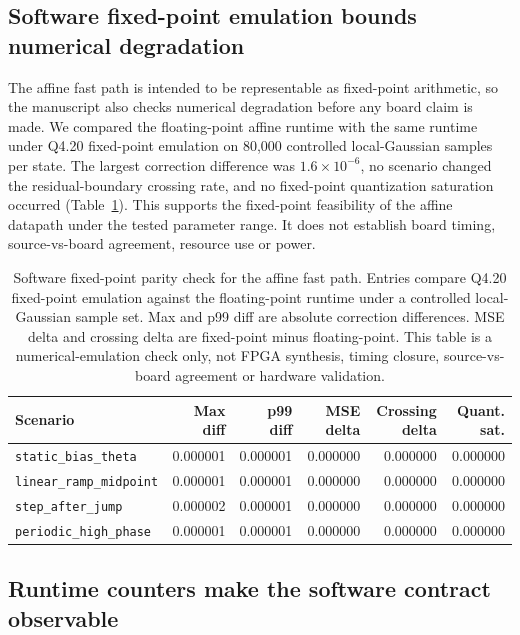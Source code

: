 \documentclass[11pt]{article}
\begin{document}
\subsection{Software fixed-point emulation bounds numerical degradation}

The affine fast path is intended to be representable as fixed-point arithmetic,
so the manuscript also checks numerical degradation before any board claim is
made.  We compared the floating-point affine runtime with the same runtime under
Q4.20 fixed-point emulation on 80,000 controlled local-Gaussian samples per
state.  The largest correction difference was \(1.6\times 10^{-6}\), no
scenario changed the residual-boundary crossing rate, and no fixed-point
quantization saturation occurred (Table~\ref{tab:fixed-point-parity}).  This
supports the fixed-point feasibility of the affine datapath under the tested
parameter range.  It does not establish board timing, source-vs-board agreement,
resource use or power.

\begin{table}[t]
\centering
\small
\begin{tabular}{@{}lrrrrr@{}}
\toprule
Scenario & Max diff & p99 diff & MSE delta & Crossing delta & Quant. sat. \\
\midrule
\texttt{static\_bias\_theta} & 0.000001 & 0.000001 & 0.000000 & 0.000000 & 0.000000 \\
\texttt{linear\_ramp\_midpoint} & 0.000001 & 0.000001 & 0.000000 & 0.000000 & 0.000000 \\
\texttt{step\_after\_jump} & 0.000002 & 0.000001 & 0.000000 & 0.000000 & 0.000000 \\
\texttt{periodic\_high\_phase} & 0.000001 & 0.000001 & 0.000000 & 0.000000 & 0.000000 \\
\bottomrule
\end{tabular}
\caption{Software fixed-point parity check for the affine fast path.  Entries
compare Q4.20 fixed-point emulation against the floating-point runtime under a
controlled local-Gaussian sample set.  Max and p99 diff are absolute correction
differences.  MSE delta and crossing delta are fixed-point minus floating-point.
This table is a numerical-emulation check only, not FPGA synthesis, timing
closure, source-vs-board agreement or hardware validation.}
\label{tab:fixed-point-parity}
\end{table}

\subsection{Runtime counters make the software contract observable}
\end{document}

